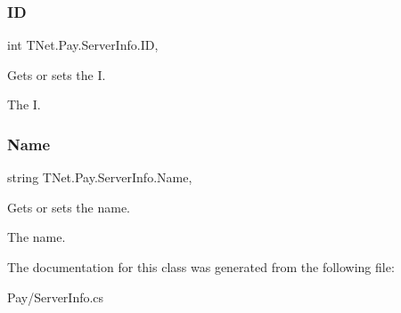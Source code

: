 \subsubsection{\texorpdfstring{ID}{ID}}
{\footnotesize\ttfamily int T\+Net.\+Pay.\+Server\+Info.\+ID\hspace{0.3cm}{\ttfamily [get]}, {\ttfamily [set]}}



Gets or sets the I. 

The I.\mbox{\label{class_t_net_1_1_pay_1_1_server_info_a37ddc97be7197b1153fdef62e49be593}} 
\subsubsection{\texorpdfstring{Name}{Name}}
{\footnotesize\ttfamily string T\+Net.\+Pay.\+Server\+Info.\+Name\hspace{0.3cm}{\ttfamily [get]}, {\ttfamily [set]}}



Gets or sets the name. 

The name.

The documentation for this class was generated from the following file\+:\begin{DoxyCompactItemize}
\item 
Pay/Server\+Info.\+cs\end{DoxyCompactItemize}
